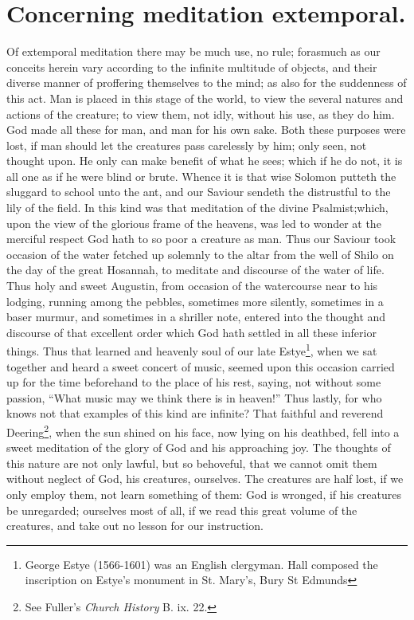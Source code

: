\section{Concerning meditation extemporal.}
Of extemporal meditation there may be much use, no rule; forasmuch as our conceits herein vary according to the infinite multitude of objects, and their diverse manner of proffering themselves to the mind; as also for the suddenness of this act. Man is placed in this stage of the world, to view the several natures and actions of the creature; to view them, not idly, without his use, as they do him. God made all these for man, and man for his own sake. Both these purposes were lost, if man should let the creatures pass carelessly by him; only seen, not thought upon. He only can make benefit of what he sees; which if he do not, it is all one as if he were blind or brute. Whence it is that wise Solomon putteth the sluggard to school unto the ant, and our Saviour sendeth the distrustful to the lily of the field. In this kind was that meditation of the divine Psalmist;which, upon the view of the glorious frame of the heavens, was led to wonder at the merciful respect God hath to so poor a creature as man. Thus our Saviour took occasion of the water fetched up solemnly to the altar from the well of Shilo on the day of the great Hosannah, to meditate and discourse of the water of life. Thus holy and sweet Augustin, from occasion of the watercourse near to his lodging, running among the pebbles, sometimes more silently, sometimes in a baser murmur, and sometimes in a shriller note, entered into the thought and discourse of that excellent order which God hath settled in all these inferior things. Thus that learned and heavenly soul of our late Estye\footnote{George Estye (1566-1601) was an English clergyman. Hall composed the inscription on Estye's monument in St. Mary's, Bury St Edmunds}, when we sat together and heard a sweet concert of music, seemed upon this occasion carried up for the time beforehand to the place of his rest, saying, not without some passion, ``What music may we think there is in heaven!'' Thus lastly, for who knows not that examples of this kind are infinite? That faithful and reverend Deering\footnote{See Fuller's \emph{Church History} B. ix. 22.}, when the sun shined on his face, now lying on his deathbed, fell into a sweet meditation of the glory of God and his approaching joy. The thoughts of this nature are not only lawful, but so behoveful, that we cannot omit them without neglect of God, his creatures, ourselves. The creatures are half lost, if we only employ them, not learn something of them: God is wronged, if his creatures be unregarded; ourselves most of all, if we read this great volume of the creatures, and take out no lesson for our instruction. 

